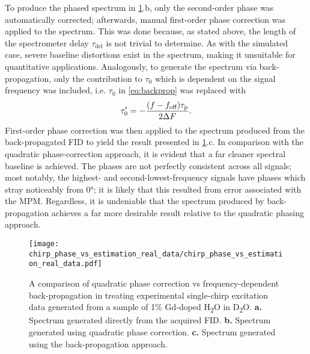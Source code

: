 To produce the phased spectrum in \cref{fig:bbqchili-real}.b, only the
second-order phase was automatically corrected; afterwards, manual
first-order phase correction was applied to the spectrum. This was done
because, as stated above, the
length of the spectrometer delay $\tau_{\text{del}}$ is not trivial to
determine. As with the simulated case, severe baseline distortions exist in the
spectrum, making it unsuitable for quantitative applications.
Analogously, to generate the spectrum via back-propagation, only the
contribution to $\tau_0$ which is dependent on the signal frequency was
included, i.e. $\tau_0$ in \cref{eq:backprop} was replaced with
\begin{equation}
    \tau_{0}^{\prime} = -\frac{(f - f_{\text{off}}) \tau_{\text{p}}}{2 \Delta F}.
\end{equation}
First-order phase correction was then applied to the spectrum produced from the
back-propagated \ac{FID} to yield the result presented in
\cref{fig:bbqchili-real}.c.
In comparison with the quadratic phase-correction approach, it is evident that
a far cleaner spectral baseline is achieved. The phases are not perfectly
consistent across all signals; most notably, the highest- and
second-lowest-frequency signals have phases which stray noticeably from
\ang{0}; it is likely that this resulted from error associated with the
\ac{MPM}. Regardless, it is undeniable that the spectrum produced by
back-propagation achieves a far more desirable result relative to the quadratic
phasing approach.

\begin{figure}
    \centering
    \texttt{[image: chirp\_phase\_vs\_estimation\_real\_data/chirp\_phase\_vs\_estimation\_real\_data.pdf]}
    \caption[
        A comparison of quadratic phase correction vs frequency-dependent
        back-propagation in treating experimental single-chirp excitation data
        generated from a sample of Gd-doped H\textsubscript{2}O in
        D\textsubscript{2}O.
    ]{
        A comparison of quadratic phase correction vs frequency-dependent
        back-propagation in treating experimental single-chirp excitation data
        generated from a sample of 1\% Gd-doped H\textsubscript{2}O in
        D\textsubscript{2}O.
        \textbf{a.} Spectrum generated directly from the acquired \ac{FID}.
        \textbf{b.} Spectrum generated using quadratic phase correction.
        \textbf{c.} Spectrum generated using the back-propagation approach.
    }
    \label{fig:bbqchili-real}
\end{figure}
